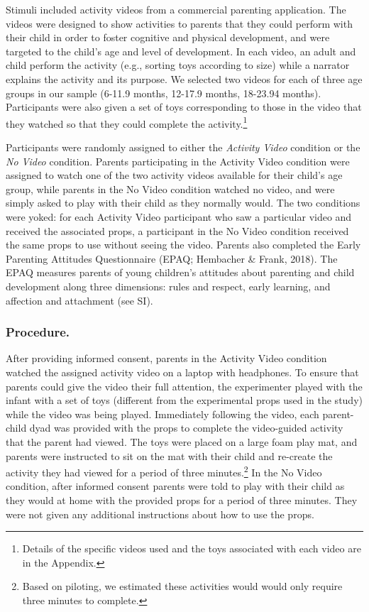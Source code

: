 \documentclass[man,floatsintext]{apa6}
\let\rmarkdownfootnote\footnote%
\def\footnote{\protect\rmarkdownfootnote}
\begin{document}
Stimuli included activity videos from a commercial parenting application.
The videos were designed to show activities to parents that they could perform with their child in order to foster cognitive and physical development, and were targeted to the child's age and level of development.
In each video, an adult and child perform the activity (e.g., sorting toys according to size) while a narrator explains the activity and its purpose.
We selected two videos for each of three age groups in our sample (6-11.9 months, 12-17.9 months, 18-23.94 months).
Participants were also given a set of toys corresponding to those in the video that they watched so that they could complete the activity.\footnote{Details of the specific videos used and the toys associated with each video are in the Appendix.}

Participants were randomly assigned to either the \emph{Activity Video} condition or the \emph{No Video} condition.
Parents participating in the Activity Video condition were assigned to watch one of the two activity videos available for their child's age group, while parents in the No Video condition watched no video, and were simply asked to play with their child as they normally would.
The two conditions were yoked: for each Activity Video participant who saw a particular video and received the associated props, a participant in the No Video condition received the same props to use without seeing the video.
Parents also completed the Early Parenting Attitudes Questionnaire (EPAQ; Hembacher \& Frank, 2018).
The EPAQ measures parents of young children's attitudes about parenting and child development along three dimensions: rules and respect, early learning, and affection and attachment (see SI).

\hypertarget{procedure.}{%
\subsubsection{Procedure.}\label{procedure.}}

After providing informed consent, parents in the Activity Video condition watched the assigned activity video on a laptop with headphones.
To ensure that parents could give the video their full attention, the experimenter played with the infant with a set of toys (different from the experimental props used in the study) while the video was being played.
Immediately following the video, each parent-child dyad was provided with the props to complete the video-guided activity that the parent had viewed.
The toys were placed on a large foam play mat, and parents were instructed to sit on the mat with their child and re-create the activity they had viewed for a period of three minutes.\footnote{Based on piloting, we estimated these activities would would only require three minutes to complete.}
In the No Video condition, after informed consent parents were told to play with their child as they would at home with the provided props for a period of three minutes.
They were not given any additional instructions about how to use the props.
\end{document}
